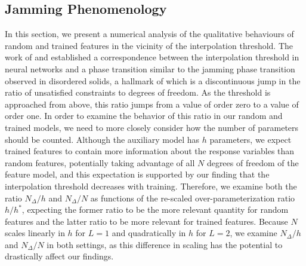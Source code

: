 \documentclass[11pt]{article}
\begin{document}
\subsection{Jamming Phenomenology}
In this section, we present a numerical analysis of the qualitative behaviours of random and trained features in the vicinity of the interpolation threshold. The work of \cite{geigerJammingTransitionParadigm2019} and \cite{spiglerJammingTransitionOverparametrization2019} established a correspondence between the interpolation threshold in neural networks and a phase transition similar to the jamming phase transition observed in disordered solids, a hallmark of which is a discontinuous jump in the ratio of unsatisfied constraints to degrees of freedom. As the threshold is approached from above, this ratio jumps from a value of order zero to a value of order one. In order to examine the behavior of this ratio in our random and trained models, we need to more closely consider how the number of parameters should be counted. Although the auxiliary model has $h$ parameters, we expect trained features to contain more information about the response variables than random features, potentially taking advantage of all $N$ degrees of freedom of the feature model, and this expectation is supported by our finding that the interpolation threshold decreases with training. Therefore, we examine both the ratio $N_\Delta/h$ and $N_\Delta/N$ as functions of the re-scaled over-parameterization ratio $h/h^*$, expecting the former ratio to be the more relevant quantity for random features and the latter ratio to be more relevant for trained features. Because $N$ scales linearly in $h$ for $L=1$ and quadratically in $h$ for $L=2$, we examine $N_\Delta/h$ and $N_\Delta/N$ in both settings, as this difference in scaling has the potential to drastically affect our findings.\\
\end{document}
